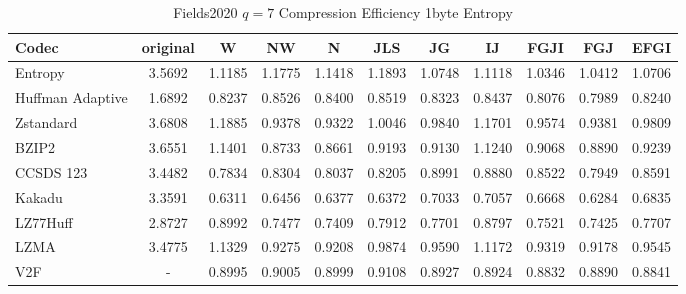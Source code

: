 \documentclass{article}
\begin{document}
\begin{table}[h!]
\centering
\caption{Fields2020 $q=7$ Compression Efficiency 1byte Entropy}
\begin{tabular}{|l|cccccccccc|}
\hline
Codec &  original &      W &     NW &      N &    JLS &     JG &     IJ &   FGJI &    FGJ &   EFGI \\
\hline
Entropy & 3.5692 & 1.1185 & 1.1775 & 1.1418 & 1.1893 & 1.0748 & 1.1118 & 1.0346 & 1.0412 & 1.0706 \\
\hline
Huffman Adaptive &    1.6892 & 0.8237 & 0.8526 & 0.8400 & 0.8519 & 0.8323 & 0.8437 & 0.8076 & 0.7989 & 0.8240 \\
Zstandard        &    3.6808 & 1.1885 & 0.9378 & 0.9322 & 1.0046 & 0.9840 & 1.1701 & 0.9574 & 0.9381 & 0.9809 \\
BZIP2            &    3.6551 & 1.1401 & 0.8733 & 0.8661 & 0.9193 & 0.9130 & 1.1240 & 0.9068 & 0.8890 & 0.9239 \\
CCSDS 123        &    3.4482 & 0.7834 & 0.8304 & 0.8037 & 0.8205 & 0.8991 & 0.8880 & 0.8522 & 0.7949 & 0.8591 \\
Kakadu           &    3.3591 & 0.6311 & 0.6456 & 0.6377 & 0.6372 & 0.7033 & 0.7057 & 0.6668 & 0.6284 & 0.6835 \\
LZ77Huff         &    2.8727 & 0.8992 & 0.7477 & 0.7409 & 0.7912 & 0.7701 & 0.8797 & 0.7521 & 0.7425 & 0.7707 \\
LZMA             &    3.4775 & 1.1329 & 0.9275 & 0.9208 & 0.9874 & 0.9590 & 1.1172 & 0.9319 & 0.9178 & 0.9545 \\
V2F              &    - & 0.8995 & 0.9005 & 0.8999 & 0.9108 & 0.8927 & 0.8924 & 0.8832 & 0.8890 & 0.8841 \\
\hline
\end{tabular}
\end{table}
\end{document}
